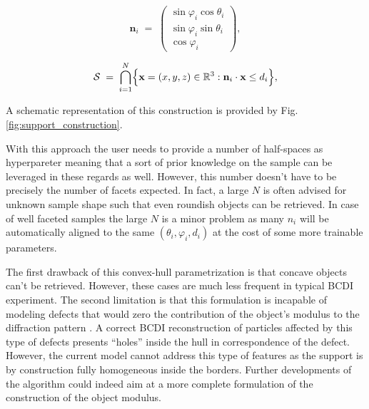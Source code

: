 \begin{equation}
    \mathbf n_i \;=\;
    \begin{pmatrix}
    \sin\varphi_i\cos\theta_i \\[6pt]
    \sin\varphi_i\sin\theta_i \\[6pt]
    \cos\varphi_i
    \end{pmatrix},
    \label{eq:normal_vector}
\end{equation}
    
\begin{equation}
    \mathcal S \;=\;
    \bigcap_{i=1}^N
    \Bigl\{\mathbf x=(x,y,z)\in\mathbb R^3 : 
    \mathbf n_i\cdot\mathbf x \le d_i\Bigr\},
    \label{eq:convex_hull}
\end{equation}

A schematic representation of this construction is provided by Fig. \ref{fig:support_construction}.
 
With this approach the user needs to provide a number of half-spaces as hyperpareter meaning that a sort of prior knowledge 
on the sample can be leveraged in these regards as well. However, this number doesn't have to be precisely the number of 
facets expected. In fact, a large $N$ is often advised for unknown sample shape such that even roundish objects can be 
retrieved. In case of well faceted samples the large $N$ is a minor problem as many $n_i$ will be automatically aligned to the 
same $(\theta_i, \varphi_i, d_i)$ at the cost of some more trainable parameters. 

The first drawback of this convex-hull parametrization is that concave objects can't be retrieved. However, these cases 
are much less frequent in typical BCDI experiment. The second limitation is that this formulation is incapable of modeling 
defects that would zero the contribution of the object's modulus to the diffraction pattern \cite{favre-nicolin_analysis_2010}. 
A correct BCDI reconstruction of particles affected by this type of defects presents ``holes'' inside the hull in correspondence of the 
defect. However, the current model cannot address this type of features as the support is by construction fully homogeneous 
inside the borders. Further developments of the algorithm could indeed aim at a more complete formulation of the construction 
of the object modulus. 

